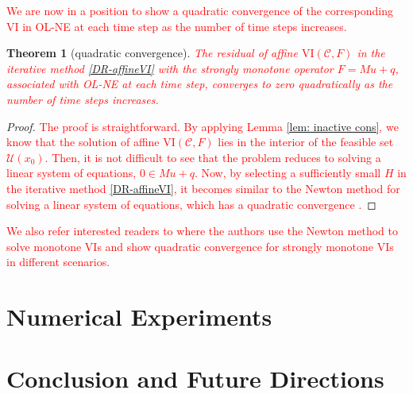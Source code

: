\documentclass[letterpaper, 10 pt, conference]{ieeeconf}  %
\newcommand{\red}[1]{\textcolor{red}{#1}}
\newtheorem{theorem}{Theorem}
\begin{document}
\red{We are now in a position to show a quadratic convergence of the corresponding VI in OL-NE at each time step as the number of time steps increases.}
\begin{theorem}[quadratic convergence]
   \red{The residual of affine \(\mathrm{VI}(\mathcal{C}, F)\) in the iterative method \eqref{DR-affineVI} with the strongly monotone operator $F = Mu + q$, associated with OL-NE at each time step, converges to zero quadratically as the number of time steps increases.}
\end{theorem}
\begin{proof}
   \red{The proof is straightforward. By applying Lemma \eqref{lem: inactive cons}, we know that the solution of affine \(\mathrm{VI}(\mathcal{C}, F)\) lies in the interior of the feasible set $\mathcal{U}(x_0)$. Then, it is not difficult to see that the problem reduces to solving a linear system of equations, $0 \in Mu + q$. Now, by selecting a sufficiently small $H$ in the iterative method \eqref{DR-affineVI}, it becomes similar to the Newton method for solving a linear system of equations, which has a quadratic convergence \cite{greenbaum1997iterative}.}
\end{proof}
\red{We also refer interested readers to \cite{taji1993globally,marcotte1987note} where the authors use the Newton method to solve monotone VIs and show quadratic convergence for strongly monotone VIs in different scenarios.}
\section{Numerical Experiments}\label{sec: simulation}
\section{Conclusion and Future Directions}\label{sec: conclusion}




\end{document}
